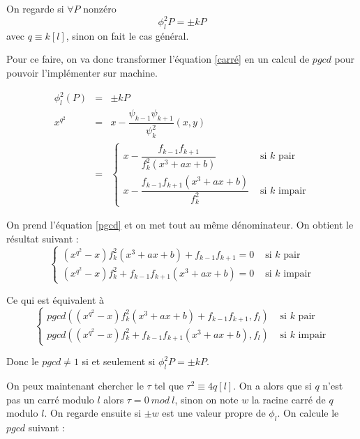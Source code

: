 \documentclass{article}%
\theoremstyle{plain}
\theoremstyle{definition}
\theoremstyle{plain}
\theoremstyle{plain}
\theoremstyle{remark}
\begin{document}
On regarde si $\forall P$ nonzéro \begin{equation}
\phi_{l}^{2}P = \pm kP
\label{carré}
\end{equation} avec $q\equiv k[l]$, sinon on fait le cas général.

Pour ce faire, on va donc transformer l'équation \eqref{carré} en un calcul de $pgcd$ pour pouvoir l'implémenter sur machine.

\begin{eqnarray}
\phi_{l}^{2}(P)&=&\pm kP \nonumber\\ 
x^{q^{2}}&=&x-\dfrac{\psi_{k - 1}\psi_{k + 1}}{\psi_{k}^{2}}(x,y)\\
&=&\begin{cases}x-\dfrac{f_{k - 1}f_{k + 1}}{f_{k}^{2}(x^{3} + ax +b)}&\text{ si }k\text{ pair}\\
x-\dfrac{f_{k - 1}f_{k + 1}(x^{3} + ax +b)}{f_{k}^{2}}&\text{ si }k\text{ impair}
\label{pgcd}
\end{cases}
\end{eqnarray}

On prend l'équation \eqref{pgcd} et on met tout au même dénominateur. On obtient le résultat suivant :
\begin{equation}
\begin{cases}(x^{q^{2}} - x)f_{k}^{2}(x^{3} + ax +b) + f_{k - 1}f_{k + 1}= 0&\text{ si }k\text{ pair}\\
(x^{q^{2}} - x)f_{k}^{2} + f_{k - 1}f_{k + 1}(x^{3} + ax +b)= 0&\text{ si }k\text{ impair}
\end{cases}
\end{equation}

Ce qui est équivalent à 
\begin{equation}
\begin{cases}pgcd((x^{q^{2}} - x)f_{k}^{2}(x^{3} + ax +b) + f_{k - 1}f_{k + 1},f_{l})&\text{ si }k\text{ pair}\\
pgcd((x^{q^{2}} - x)f_{k}^{2} + f_{k - 1}f_{k + 1}(x^{3} + ax +b),f_{l})&\text{ si }k\text{ impair}
\end{cases}
\end{equation}

Donc le $pgcd\neq 1$ si et seulement si $\phi_{l}^{2}P = \pm kP$.

On peux maintenant chercher le $\tau$ tel que $\tau^{2}\equiv 4q [l]$.
On a alors que si $q$ n'est pas un carré modulo $l$ alors $\tau = 0\ mod\ l$, sinon on note $w$ la racine carré de $q$ modulo $l$. On regarde ensuite si $\pm w$ est une valeur propre de $\phi_{l}$.
On calcule le $pgcd$ suivant : 
\end{document}
